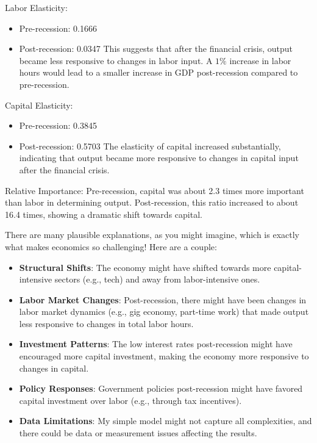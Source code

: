 \documentclass[10pt]{article}
\begin{document}
Labor Elasticity:

\begin{itemize}
  \item Pre-recession: 0.1666
  \item Post-recession: 0.0347 This suggests that after the financial crisis, output became less responsive to changes in labor input. A $1 \%$ increase in labor hours would lead to a smaller increase in GDP post-recession compared to pre-recession.
\end{itemize}

Capital Elasticity:

\begin{itemize}
  \item Pre-recession: 0.3845
  \item Post-recession: 0.5703 The elasticity of capital increased substantially, indicating that output became more responsive to changes in capital input after the financial crisis.
\end{itemize}

Relative Importance: Pre-recession, capital was about 2.3 times more important than labor in determining output. Post-recession, this ratio increased to about 16.4 times, showing a dramatic shift towards capital.

There are many plausible explanations, as you might imagine, which is exactly what makes economics so challenging! Here are a couple:

\begin{itemize}
  \item \textbf{Structural Shifts}: The economy might have shifted towards more capital-intensive sectors (e.g., tech) and away from labor-intensive ones.
  \item \textbf{Labor Market Changes}: Post-recession, there might have been changes in labor market dynamics (e.g., gig economy, part-time work) that made output less responsive to changes in total labor hours.
  \item \textbf{Investment Patterns}: The low interest rates post-recession might have encouraged more capital investment, making the economy more responsive to changes in capital.
  \item \textbf{Policy Responses}: Government policies post-recession might have favored capital investment over labor (e.g., through tax incentives).
  \item \textbf{Data Limitations}: My simple model might not capture all complexities, and there could be data or measurement issues affecting the results. 
\end{itemize}
\end{document}
